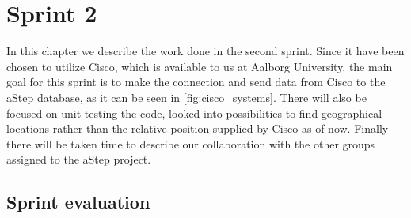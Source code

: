 \chapter{Sprint 2}
In this chapter we describe the work done in the second sprint. Since it have been chosen to utilize Cisco, which is available to us at Aalborg University, the main goal for this sprint is to make the connection and send data from Cisco to the aStep database, as it can be seen in \cref{fig:cisco_systems}. There will also be focused on unit testing the code, looked into possibilities to find geographical locations rather than the relative position supplied by Cisco as of now. Finally there will be taken time to describe our collaboration with the other groups assigned to the aStep project.






\section{Sprint evaluation}